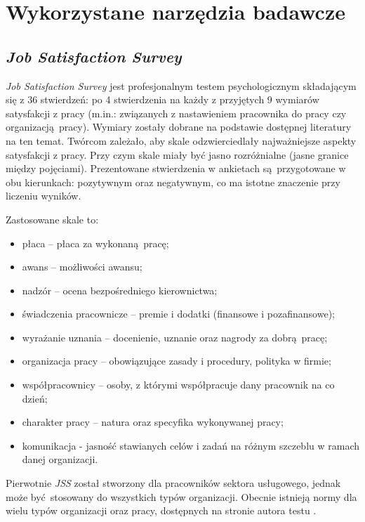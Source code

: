 \chapter{Wykorzystane narzędzia badawcze}
\section{\emph{Job Satisfaction Survey}}
\emph{Job Satisfaction Survey} jest profesjonalnym testem psychologicznym składającym się z 36 stwierdzeń: po 4 stwierdzenia na każdy z przyjętych 9 wymiarów satysfakcji z pracy (m.in.: związanych z nastawieniem pracownika do pracy czy organizacją pracy). Wymiary zostały dobrane na podstawie dostępnej literatury na ten temat. Twórcom zależało, aby skale odzwierciedlały najważniejsze aspekty satysfakcji z pracy. Przy czym skale miały być jasno
rozróżnialne (jasne granice między pojęciami). Prezentowane stwierdzenia w ankietach są przygotowane w obu kierunkach: pozytywnym oraz negatywnym, co ma istotne znaczenie przy liczeniu wyników. 

Zastosowane skale to:
\begin{itemize}
\item płaca -- płaca za wykonaną pracę;
\item awans -- możliwości awansu;
\item nadzór -- ocena bezpośredniego kierownictwa;
\item świadczenia pracownicze -- premie i dodatki (finansowe i pozafinansowe);
\item wyrażanie uznania -- docenienie, uznanie oraz nagrody za dobrą pracę;
\item organizacja pracy -- obowiązujące zasady i procedury, polityka w firmie;
\item współpracownicy -- osoby, z którymi współpracuje dany pracownik na co dzień;
\item charakter pracy -- natura oraz specyfika wykonywanej pracy;
\item komunikacja - jasność stawianych celów i zadań na różnym szczeblu w ramach danej organizacji.
\end{itemize}

Pierwotnie \emph{JSS} został stworzony dla pracowników sektora usługowego, jednak może być stosowany do wszystkich typów organizacji. Obecnie istnieją normy dla wielu typów organizacji oraz pracy, dostępnych na stronie autora testu \cite{web:jss-norms}.  

